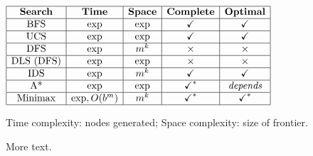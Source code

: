 \documentclass[10pt, landscape]{article}
\makeatletter
\renewcommand{\section}{\@startsection{section}{1}{0mm}%
                                {-1ex plus -.5ex minus -.2ex}%
                                {0.5ex plus .2ex}%
                                {\normalfont\large\bfseries}}
\makeatother
\begin{document}
\begin{minipage}{0.4\linewidth} 


    $\begin{array}{| c | c | c | c | c |}
        \hline\textbf{Search} & \textbf{Time} & \textbf{Space} & \textbf{Complete} & \textbf{Optimal} 
        \\\hline\text{BFS} & \exp & \exp & \checkmark & \checkmark
        \\\hline\text{UCS} & \exp & \exp & \checkmark & \checkmark
        \\\hline\text{DFS} & \exp & m^k & \times & \times
        \\\hline\text{DLS (DFS)} & \exp & \exp & \times & \times
        \\\hline\text{IDS} & \exp & m^k & \checkmark & \checkmark
        \\\hline\text{A*} & \exp & \exp & \checkmark^* & \textit{depends}
        \\\hline\text{Minimax} & \exp, O(b^m) & m^k & \checkmark^* & \checkmark^*
        \\\hline
    \end{array} 
    $\

    Time complexity: nodes generated; Space complexity: size of frontier.


    
\end{minipage}%
\begin{minipage}{0.6\linewidth}   
    \begin{multicols}{2}
        More text.
    \end{multicols}
\end{minipage}
\end{document}
